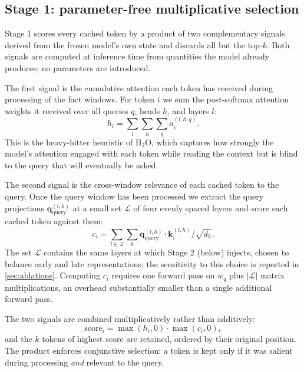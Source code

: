\subsection{Stage 1: parameter-free multiplicative selection}\label{sec:s1}

Stage 1 scores every cached token by a product of two complementary
signals derived from the frozen model's own state and discards all but
the top-$k$. Both signals are computed at inference time from quantities
the model already produces; no parameters are introduced.

The first signal is the cumulative attention each token has received
during processing of the fact windows. For token $i$ we sum the
post-softmax attention weights it received over all queries $q$, heads
$h$, and layers $l$:
\begin{equation}
    h_i = \sum_l \sum_h \sum_q a_i^{(l,h,q)}.
    \label{eq:heuristic}
\end{equation}
This is the heavy-hitter heuristic of H${}_2$O\cite{zhang2023h2o},
which captures how strongly the model's attention engaged with each
token while reading the context but is blind to the query that will
eventually be asked.

The second signal is the cross-window relevance of each cached token to
the query. Once the query window has been processed we extract the
query projections $\mathbf{q}_{\mathrm{query}}^{(l,h)}$ at a small set
$\mathcal{L}$ of four evenly spaced layers and score each cached token
against them:
\begin{equation}
    c_i = \sum_{l \in \mathcal{L}} \sum_h
          \mathbf{q}_{\mathrm{query}}^{(l,h)} \cdot \mathbf{k}_i^{(l,h)}
          \big/ \sqrt{d_h}.
    \label{eq:cross}
\end{equation}
The set $\mathcal{L}$ contains the same layers at which Stage 2 (below)
injects, chosen to balance early and late representations; the
sensitivity to this choice is reported in
\cref{sec:ablations}. Computing $c_i$ requires one forward pass on
$w_q$ plus $|\mathcal{L}|$ matrix multiplications, an overhead
substantially smaller than a single additional forward pass.

The two signals are combined multiplicatively rather than additively:
\begin{equation}
    \mathrm{score}_i = \max(h_i, 0)\cdot\max(c_i, 0),
    \label{eq:mult}
\end{equation}
and the $k$ tokens of highest score are retained, ordered by their
original position. The product enforces conjunctive selection: a token
is kept only if it was salient during processing \emph{and} relevant
to the query.

